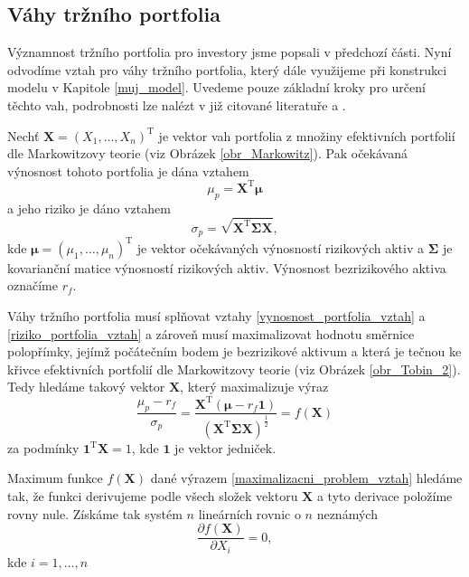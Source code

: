 \documentclass[a4paper,12pt]{report}
\theoremstyle{definition} \newtheorem{definice}[veta]{Definice}
\theoremstyle{remark}
\begin{document}
\subsection{Váhy tržního portfolia}\label{vahy_kap}
Významnost tržního portfolia pro investory jsme popsali v předchozí části.
Nyní odvodíme vztah pro váhy tržního portfolia, který dále využijeme při konstrukci modelu v Kapitole \ref{muj_model}.
Uvedeme pouze základní kroky pro určení těchto vah, podrobnosti lze nalézt v již citované literatuře \cite{vcamskyteorie} a \cite{fabozziportfolio}.

Nechť $\boldsymbol{X}=(X_1,\dots,X_n)^\mathrm{T}$ je vektor vah portfolia z množiny efektivních portfolií dle Markowitzovy teorie (viz Obrázek \ref{obr_Markowitz}).
Pak očekávaná výnosnost tohoto portfolia je dána vztahem
\begin{equation}\label{vynosnost_portfolia_vztah}
 \mu_p=\boldsymbol{X}^\mathrm{T}\boldsymbol{\mu}
\end{equation}
a jeho riziko je dáno vztahem 
\begin{equation}\label{riziko_portfolia_vztah}
\sigma_p=\sqrt{\boldsymbol{X}^\mathrm{T}\boldsymbol{\Sigma}\boldsymbol{X}},
\end{equation}
kde $\boldsymbol{\mu}=(\mu_1,\dots,\mu_n)^\mathrm{T}$ je vektor očekávaných výnosností rizikových aktiv  a $\boldsymbol{\Sigma}$ je kovarianční matice výnosností rizikových aktiv.
Výnosnost bezrizikového aktiva označíme $r_f$.

Váhy tržního portfolia musí splňovat vztahy \eqref{vynosnost_portfolia_vztah} a \eqref{riziko_portfolia_vztah} a zároveň musí maximalizovat hodnotu směrnice polopřímky, jejímž počátečním bodem je bezrizikové aktivum a která je tečnou ke křivce efektivních portfolií dle Markowitzovy teorie (viz Obrázek \ref{obr_Tobin_2}).
Tedy hledáme takový vektor $\boldsymbol{X}$, který maximalizuje výraz
\begin{equation} \label{maximalizacni_problem_vztah}
\frac{\mu_p-r_f}{\sigma_p}=\frac{\boldsymbol{X}^\mathrm{T}\left(\boldsymbol{\mu}-r_f\boldsymbol{1}\right)}{\left({\boldsymbol{X}^\mathrm{T}\boldsymbol{\Sigma}\boldsymbol{X}}\right)^\frac12}= f(\boldsymbol{X})
\end{equation}
za podmínky $\boldsymbol{1}^\mathrm{T}\boldsymbol{X}=1$, kde $\boldsymbol{1}$ je vektor jedniček.

Maximum funkce $f(\boldsymbol{X})$ dané výrazem \eqref{maximalizacni_problem_vztah} hledáme tak, že funkci derivujeme podle všech složek vektoru $\boldsymbol{X}$ a tyto derivace položíme rovny nule.
Získáme tak systém $n$ lineárních rovnic o $n$ neznámých
\begin{equation}\label{maximalizace_rovnice}
 \frac{\partial f(\boldsymbol{X})}{\partial{X_i}}=0,
\end{equation}
kde $i=1,\dots,n$
\end{document}
